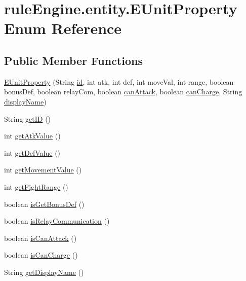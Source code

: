 \hypertarget{enumrule_engine_1_1entity_1_1_e_unit_property}{}\section{rule\+Engine.\+entity.\+E\+Unit\+Property Enum Reference}
\label{enumrule_engine_1_1entity_1_1_e_unit_property}
\subsection*{Public Member Functions}
\begin{DoxyCompactItemize}
\item 
\mbox{\hyperlink{enumrule_engine_1_1entity_1_1_e_unit_property_adb237a99b37dfcbde17cd6dbb5abd449}{E\+Unit\+Property}} (String \mbox{\hyperlink{enumrule_engine_1_1entity_1_1_e_unit_property_a9dc3ae182f33d6ee2032b5ad42da3d15}{id}}, int atk, int def, int move\+Val, int range, boolean bonus\+Def, boolean relay\+Com, boolean \mbox{\hyperlink{enumrule_engine_1_1entity_1_1_e_unit_property_aa73042ddcfa87f1d2212895f2b991ceb}{can\+Attack}}, boolean \mbox{\hyperlink{enumrule_engine_1_1entity_1_1_e_unit_property_a8d633a4666dd2864331ed62f72cf7dbc}{can\+Charge}}, String \mbox{\hyperlink{enumrule_engine_1_1entity_1_1_e_unit_property_a3d90c16596a005efe95099d12ae7da1d}{display\+Name}})
\item 
String \mbox{\hyperlink{enumrule_engine_1_1entity_1_1_e_unit_property_ab4ed754cd27ac3abab4a2e3951da7005}{get\+ID}} ()
\item 
int \mbox{\hyperlink{enumrule_engine_1_1entity_1_1_e_unit_property_a827c762c3ba5f1bde2858d069506087c}{get\+Atk\+Value}} ()
\item 
int \mbox{\hyperlink{enumrule_engine_1_1entity_1_1_e_unit_property_a05066d575b2ab489f18315a9185729ce}{get\+Def\+Value}} ()
\item 
int \mbox{\hyperlink{enumrule_engine_1_1entity_1_1_e_unit_property_a8ce053c172aa6ffc4132feb87b6a855a}{get\+Movement\+Value}} ()
\item 
int \mbox{\hyperlink{enumrule_engine_1_1entity_1_1_e_unit_property_af85a56d807863d90dbbb3422b2cf627a}{get\+Fight\+Range}} ()
\item 
boolean \mbox{\hyperlink{enumrule_engine_1_1entity_1_1_e_unit_property_a4fe027f48fdcd08c55769992e4ad9f3d}{is\+Get\+Bonus\+Def}} ()
\item 
boolean \mbox{\hyperlink{enumrule_engine_1_1entity_1_1_e_unit_property_aaa8acb0feaca250d0d32e4c954d20535}{is\+Relay\+Communication}} ()
\item 
boolean \mbox{\hyperlink{enumrule_engine_1_1entity_1_1_e_unit_property_a90937a24e0b60b82124f8d1a1a5b7073}{is\+Can\+Attack}} ()
\item 
boolean \mbox{\hyperlink{enumrule_engine_1_1entity_1_1_e_unit_property_a546f8e7b0e437729dc8d606f301186aa}{is\+Can\+Charge}} ()
\item 
String \mbox{\hyperlink{enumrule_engine_1_1entity_1_1_e_unit_property_a782bb3fd07719464f8f5d72f4c79b226}{get\+Display\+Name}} ()
\end{DoxyCompactItemize}
